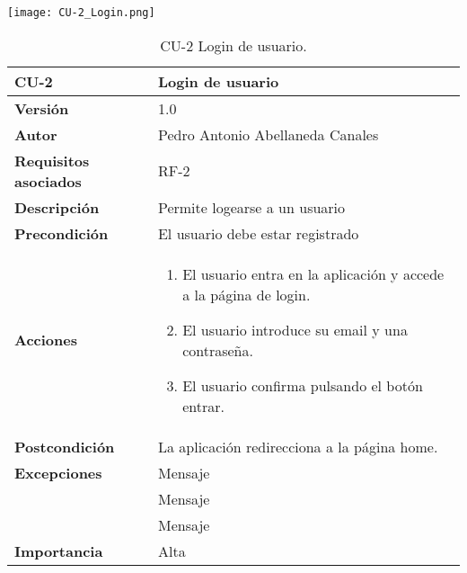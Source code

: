 \begin{table}[p]
	\centering
	\texttt{[image: CU-2\_Login.png]} %
	\begin{tabularx}{\linewidth}{ p{} p{} }
		\toprule
		\textbf{CU-2}    & \textbf{Login de usuario} \\
		\midrule
		\textbf{Versión}              & 1.0    \\
		\textbf{Autor}                & Pedro Antonio Abellaneda Canales \\
		\textbf{Requisitos asociados} & RF-2 \\
		\textbf{Descripción}          & Permite logearse a un usuario \\
		\textbf{Precondición}         & El usuario debe estar registrado \\
		\textbf{Acciones}             &
		\begin{enumerate}
			\def\labelenumi{\arabic{enumi}.}
			\tightlist
			\item El usuario entra en la aplicación y accede a la página de login.
			\item El usuario introduce su email y una contraseña.
			\item El usuario confirma pulsando el botón entrar.
		\end{enumerate} \\
		\textbf{Postcondición}        & La aplicación redirecciona a la página home. \\ 
		\textbf{Excepciones}          & Mensaje \\ 
		                              & Mensaje \\ 
		                              & Mensaje \\
		\textbf{Importancia}          & Alta \\
		\bottomrule
	\end{tabularx}
	\caption{CU-2 Login de usuario.}
	\label{tab:CU-2}
\end{table}

